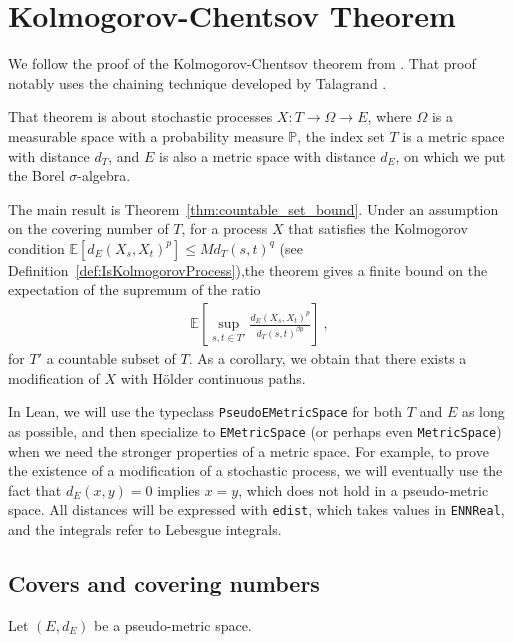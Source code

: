 \chapter{Kolmogorov-Chentsov Theorem}
\label{chap:kolmogorov_chentsov}

We follow the proof of the Kolmogorov-Chentsov theorem from \cite{kratschmer2023kolmogorov}.
That proof notably uses the chaining technique developed by Talagrand \cite{talagrand2022upper}.

That theorem is about stochastic processes $X : T \to \Omega \to E$, where $\Omega$ is a measurable space with a probability measure $\mathbb{P}$, the index set $T$ is a metric space with distance $d_T$, and $E$ is also a metric space with distance $d_E$, on which we put the Borel $\sigma$-algebra.

The main result is Theorem~\ref{thm:countable_set_bound}.
Under an assumption on the covering number of $T$, for a process $X$ that satisfies the Kolmogorov condition $\mathbb{E}[d_E(X_s, X_t)^p] \le M d_T(s, t)^q$ (see Definition~\ref{def:IsKolmogorovProcess}),the theorem gives a finite bound on the expectation of the supremum of the ratio
\begin{align*}
  \mathbb{E}\left[ \sup_{s, t \in T'} \frac{d_E(X_s, X_t)^p}{d_T(s, t)^{\beta p}} \right]
  \: ,
\end{align*}
for $T'$ a countable subset of $T$.
As a corollary, we obtain that there exists a modification of $X$ with Hölder continuous paths.

In Lean, we will use the typeclass \texttt{PseudoEMetricSpace} for both $T$ and $E$ as long as possible, and then specialize to \texttt{EMetricSpace} (or perhaps even \texttt{MetricSpace}) when we need the stronger properties of a metric space.
For example, to prove the existence of a modification of a stochastic process, we will eventually use the fact that $d_E(x, y) = 0$ implies $x = y$, which does not hold in a pseudo-metric space.
All distances will be expressed with \texttt{edist}, which takes values in \texttt{ENNReal}, and the integrals refer to Lebesgue integrals.

\section{Covers and covering numbers}

Let $(E, d_E)$ be a pseudo-metric space.






